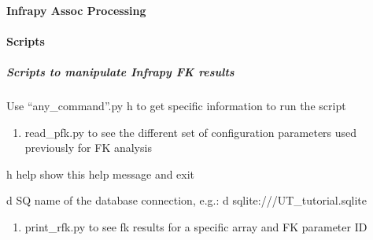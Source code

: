 \documentclass[letterpaper,10pt,english]{sphinxmanual}
\begin{document}
\begin{sphinxVerbatim}[commandchars=\\\{\}]
    
\end{sphinxVerbatim}


\paragraph{Infrapy Assoc Processing}
\label{\detokenize{assoc:infrapy-assoc-processing}}\label{\detokenize{assoc:assoc}}\label{\detokenize{assoc::doc}}
\begin{sphinxVerbatim}[commandchars=\\\{\}]
    
\end{sphinxVerbatim}


\paragraph{Scripts}
\label{\detokenize{scripts:scripts}}\label{\detokenize{scripts:id1}}\label{\detokenize{scripts::doc}}

\subparagraph{Scripts to manipulate Infrapy FK results}
\label{\detokenize{scripts:scripts-to-manipulate-infrapy-fk-results}}
Use “any\_command”.py \sphinxhyphen{}h to get specific information to run the script
\begin{enumerate}
%
\item {} 
read\_pfk.py to see the different set of configuration parameters used previously for FK analysis

\end{enumerate}

\begin{DUlineblock}{0em}
\item[] \sphinxhyphen{}h    \textendash{}help     show this help message and exit
\item[] \sphinxhyphen{}d    SQ      name of the database connection, e.g.: \sphinxhyphen{}d sqlite:///UT\_tutorial.sqlite
\end{DUlineblock}

\begin{sphinxVerbatim}[commandchars=\\\{\}]
  \PYG{p}{[}\PYG{p}{]}  
\end{sphinxVerbatim}
\begin{enumerate}
%
\setcounter{enumi}{1}
\item {} 
print\_rfk.py to see fk results for a specific array and FK parameter ID

\end{enumerate}
\end{document}
